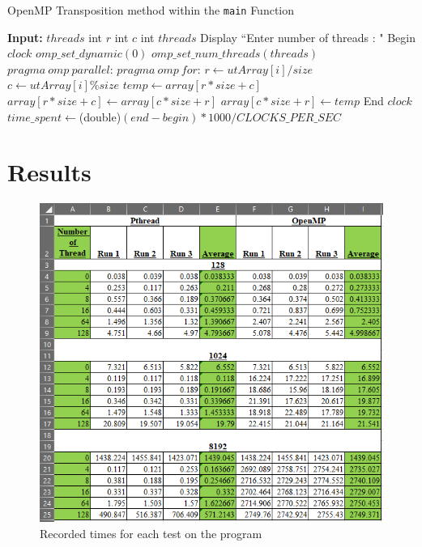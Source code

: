 \documentclass[10pt, conference]{IEEEtran}
\def\code#1{\texttt{#1}}
\begin{document}
\begin{appendices}
\begin{algorithm}[h!]
\caption{OpenMP Transposition method within the \code{main} Function}
\label{OpenMP Transposition}
\begin{algorithmic} 
\STATE \textbf{Input:} $threads$
\STATE
{}
	\STATE
	\STATE int $r$
	\STATE int $c$
	\STATE int $threads$
	\STATE Display ``Enter number of threads : "
	\STATE
	\STATE Begin $clock$
	\STATE
	\STATE $omp\_set\_dynamic(0)$
	\STATE $omp\_set\_num\_threads(threads)$
	\STATE
	\STATE $pragma\ omp\ parallel$:
	\STATE $pragma\ omp\ for$:
	\STATE
			\STATE $r \leftarrow utArray[i]/size$
			\STATE $c \leftarrow utArray[i]\%size$
			\STATE
			\STATE $temp \leftarrow array[r*size+c]$
			\STATE $array[r*size+c] \leftarrow array[c*size+r]$
			\STATE $array[c*size+r] \leftarrow temp$
		\ENDFOR
	\STATE
	\STATE End $clock$
	\STATE $time\_spent \leftarrow $(double)$(end-begin)*1000/CLOCKS\_PER\_SEC$
\ENDIF

\end{algorithmic}
\end{algorithm}

\onecolumn
\section{Results}
\label{Results Appendix}

\begin{figure}[h!]
\renewcommand{\thefigure}{\arabic{figure}}
\centering
\includegraphics[scale=0.6]{RawData.png}
\caption{Recorded times for each test on the program}
\label{RawData}
\end{figure}


\end{appendices}
\end{document}
